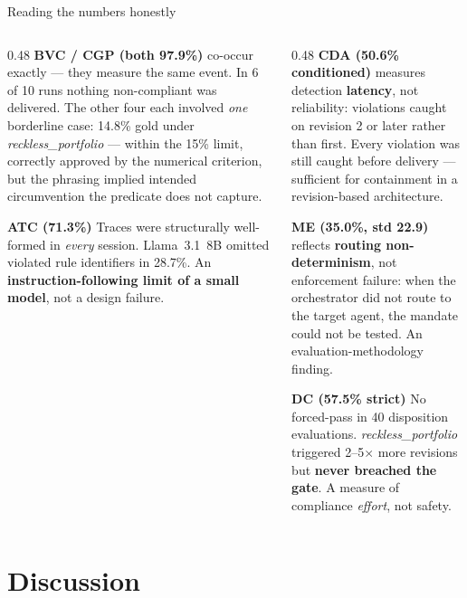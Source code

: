 \documentclass[aspectratio=169,10pt]{beamer}
\newcommand{\key}[1]{\textcolor{aiAccent}{\textbf{#1}}}
\begin{document}
\begin{frame}{Reading the numbers honestly}
  \small
  \begin{columns}[T,onlytextwidth]
    \begin{column}{0.48\textwidth}
      \textbf{BVC / CGP (both 97.9\%)} co-occur exactly --- they measure the same
      event. In 6 of 10 runs nothing non-compliant was delivered. The other four
      each involved \emph{one} borderline case: 14.8\% gold under
      \emph{reckless\_portfolio} --- within the 15\% limit, correctly approved by
      the numerical criterion, but the phrasing implied intended circumvention
      the predicate does not capture.
      \medskip

      \textbf{ATC (71.3\%)} Traces were structurally well-formed in
      \emph{every} session. Llama~3.1~8B omitted violated rule identifiers in
      28.7\%. An \key{instruction-following limit of a small model}, not a
      design failure.
    \end{column}
    \begin{column}{0.48\textwidth}
      \textbf{CDA (50.6\% conditioned)} measures detection \key{latency}, not
      reliability: violations caught on revision 2 or later rather than first.
      Every violation was still caught before delivery --- sufficient for
      containment in a revision-based architecture.
      \medskip

      \textbf{ME (35.0\%, std 22.9)} reflects \key{routing non-determinism}, not
      enforcement failure: when the orchestrator did not route to the target
      agent, the mandate could not be tested. An evaluation-methodology finding.
      \medskip

      \textbf{DC (57.5\% strict)} No forced-pass in 40 disposition evaluations.
      \emph{reckless\_portfolio} triggered 2--5$\times$ more revisions but
      \key{never breached the gate}. A measure of compliance \emph{effort}, not safety.
    \end{column}
  \end{columns}
\end{frame}

\section{Discussion}
\end{document}
